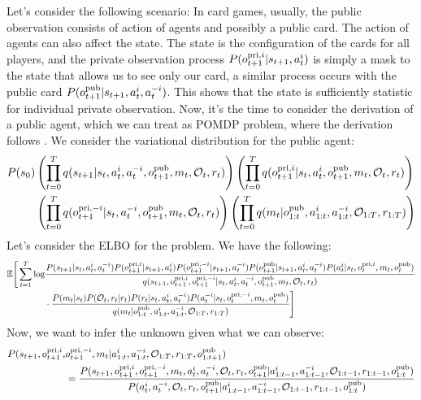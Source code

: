Let's consider the following scenario: In card games, usually, the public observation consists of action of agents and possibly a public card. The action of agents can also affect the state. The state is the configuration of the cards for all players, and the private observation process $P(o^{\operatorname{pri}, i}_{t+1} | s_{t+1}, a^i_t)$ is simply a mask to the state that allows us to see only our card, a similar process occurs with the public card $P(o^{\operatorname{pub}}_{t+1} | s_{t+1}, a^i_t, a^{-i}_t)$. This shows that the state is sufficiently statistic for individual private observation. Now, it's the time to consider the derivation of a public agent, which we can treat as POMDP problem, where the derivation follows \cite{shvechikovjoint}. We consider the variational distribution for the public agent:
\begin{equation}
\begin{aligned}
    P(s_0) &\left( \prod^T_{t=0} q(s_{t+1} | s_t, a^i_t, a^{-i}_t, o^{\operatorname{pub}}_{t+1}, m_t, \mathcal{O}_t, r_t) \right)\left( \prod^T_{t=0}q( o^{\operatorname{pri}, i}_{t+1}| s_t, a^i_t, o^{\operatorname{pub}}_{t+1}, m_t, \mathcal{O}_t, r_t) \right) \\
    &\left( \prod^T_{t=0}q(o^{\operatorname{pri}, -i}_{t+1} | s_t, a^{-i}_t, o^{\operatorname{pub}}_{t+1}, m_t, \mathcal{O}_t, r_t) \right)\left( \prod^T_{t=0} q(m_t | o^{\operatorname{pub}}_{1:t}, a^{i}_{1:t}, a^{-i}_{1:t}, \mathcal{O}_{1:T}, r_{1:T}) \right)
\end{aligned}
\end{equation} 
Let's consider the ELBO for the problem. We have the following:
\begin{equation}
\begin{aligned}
    \mathbb{E}\Bigg[ \sum^T_{t=1} \log &\frac{ P(s_{t+1} | s_t, a_t^i, a_t^{-i})P(o^{\operatorname{pri}, i}_{t+1} | s_{t+1}, a^i_t) P(o^{\operatorname{pri}, -i}_{t+1} | s_{t+1}, a^{-i}_t) P(o^{\operatorname{pub}}_{t+1} | s_{t+1}, a^i_t, a^{-i}_t) P(a^i_t | s_t, o^{\operatorname{pri}, i}_t, m_t, o^{\operatorname{pub}}_t)  }{q(s_{t+1}, o^{\operatorname{pri}, i}_{t+1}, o^{\operatorname{pri}, -i}_{t+1} | s_t, a^i_t, a^{-i}_t, o^{\operatorname{pub}}_{t+1}, m_t, \mathcal{O}_t, r_t)} \\
    &\cdot \frac{P(m_t | s_t) P(\mathcal{O}_t, r_t | r_t)P(r_t | s_t, a^i_t, a^{-i}_t) P(a^{-i}_t | s_t, o^{\operatorname{pri}, -i}_t, m_t, o^{\operatorname{pub}}_t)}{q(m_t | o^{\operatorname{pub}}_{1:t}, a^{i}_{1:t}, a^{-i}_{1:t}, \mathcal{O}_{1:T}, r_{1:T})}  \Bigg]
\end{aligned}
\end{equation}
Now, we want to infer the unknown given what we can observe:
\begin{equation}
\begin{aligned}
    P(s_{t+1}, o^{\operatorname{pri}, i}_{t+1}, &o^{\operatorname{pri}, -i}_{t+1}, m_t | a^{i}_{1:t}, a^{-i}_{1:t}, \mathcal{O}_{1:T}, r_{1:T}, o^{\operatorname{pub}}_{1:t+1}) \\
    &= \frac{P(s_{t+1}, o^{\operatorname{pri}, i}_{t+1}, o^{\operatorname{pri}, -i}_{t+1}, m_t, a^i_t, a^{-i}_t, \mathcal{O}_t, r_t , o^{\operatorname{pub}}_{t+1}| a^{i}_{1:t-1}, a^{-i}_{1:t-1}, \mathcal{O}_{1:t-1}, r_{1:t-1}, o^{\operatorname{pub}}_{1:t})}{P(a^i_t, a^{-i}_t, \mathcal{O}_t, r_t, o^{\operatorname{pub}}_{t+1} | a^{i}_{1:t-1}, a^{-i}_{1:t-1}, \mathcal{O}_{1:t-1}, r_{1:t-1}, o^{\operatorname{pub}}_{1:t})}
\end{aligned}
\end{equation}
